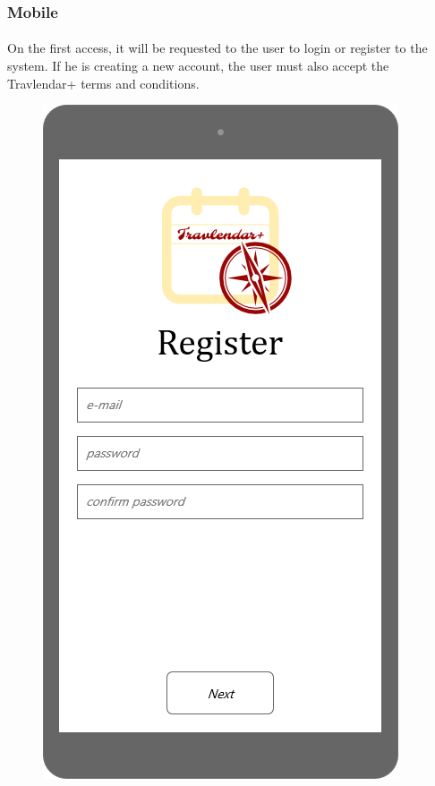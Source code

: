 \documentclass{article}
\begin{document}
		\subsubsection{Mobile}
		\paragraph{}On the first access, it will be requested to the user to login or register to the system. If he is creating a new account, the user must also accept the Travlendar+ terms and conditions.\\
			\begin{figure}[H]
			\includegraphics[width=\linewidth]{Images/Mockup/Mobile/01-email_and_password.png}

\end{figure}
\end{document}
